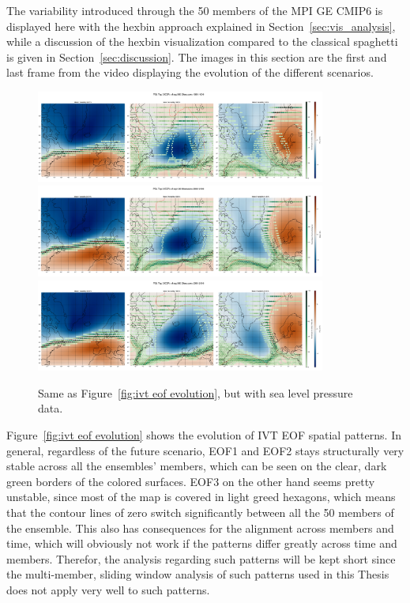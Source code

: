 The variability introduced through the 50 members of the MPI GE CMIP6 is displayed here with the hexbin approach explained in Section~\ref{sec:vis_analysis}, while a discussion of the hexbin visualization compared to the classical spaghetti is given in Section~\ref{sec:discussion}.
The images in this section are the first and last frame from the video displaying the evolution of the different scenarios.  

\begin{figure}[htb]
  \begin{center}
    \includegraphics[width=0.85\textwidth]{figures/psl_spat_patterns_hexbin_18501899_ssp585_50seasons.png}
    \includegraphics[width=0.85\textwidth]{figures/psl_spat_patterns_hexbin_20502100_ssp126_50seasons.png}
    \includegraphics[width=0.85\textwidth]{figures/psl_spat_patterns_hexbin_20502100_ssp585_50seasons.png}
  \end{center}
  \caption{Same as Figure~\ref{fig:ivt eof evolution}, but with sea level pressure data.}\label{fig:psl eof evolution}
\end{figure}




Figure~\ref{fig:ivt eof evolution} shows the evolution of IVT EOF spatial patterns. 
In general, regardless of the future scenario, EOF1 and EOF2 stays structurally very stable across all the ensembles' members, which can be seen on the clear, dark green borders of the colored surfaces. 
EOF3 on the other hand seems pretty unstable, since most of the map is covered in light greed hexagons, which means that the contour lines of zero switch significantly between all the 50 members of the ensemble. 
This also has consequences for the alignment across members and time, which will obviously not work if the patterns differ greatly across time and members. 
Therefor, the analysis regarding such patterns will be kept short since the multi-member, sliding window analysis of such patterns used in this Thesis does not apply very well to such patterns. 

